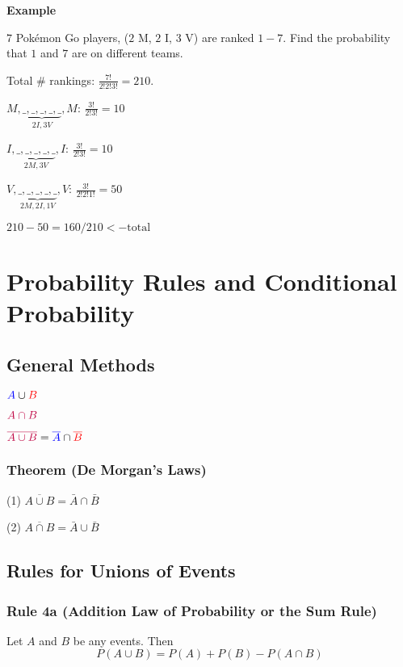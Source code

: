 \textbf{Example}

$ 7 $ Pokémon Go players, ($ 2 $ M, $ 2 $ I, $ 3 $ V) are ranked $ 1-7 $.
Find the probability that $ 1 $ and $ 7 $ are on different teams.

Total \# rankings: $\frac{7!}{2!2!3!}=210$.

$ M,\underbrace{\_,\_,\_,\_,\_}_{2I,3V},M $: $ \frac{3!}{2!3!} =10 $

$ I,\underbrace{\_,\_,\_,\_,\_}_{2M,3V},I $: $ \frac{3!}{2!3!} =10 $

$ V,\underbrace{\_,\_,\_,\_,\_}_{2M,2I,1V},V $: $ \frac{3!}{2!2!1!}=50 $

$ 210-50=160/210<-\text{total} $

\chapter{Probability Rules and Conditional Probability}

\section{General Methods}

$ {\color{blue} A}\cup {\color{red} B} $

\scalebox{0.5}{}

$ {\color{purple} A\cap B }$

\scalebox{0.5}{}

$ {\color{purple}\overline{A\cup B}}={\color{blue}\overline{A}}\cap {\color{red}\overline{B}} $

\scalebox{0.5}{}

\begin{thmbox}
    \subsection{Theorem (De Morgan's Laws)}
    (1) $\overline{A \cup B}=\bar{A}\cap \bar{B}$

    (2) $\overline{A \cap B}=\bar{A}\cup \bar{B}$
\end{thmbox}

\section{Rules for Unions of Events}

\begin{thmbox}
    \subsection{Rule 4a (Addition Law of Probability or the Sum Rule)}
    Let $ A $ and $ B $ be any events. Then
    \[ P(A\cup B)=P(A)+P(B)-P(A\cap B) \]
\end{thmbox}

